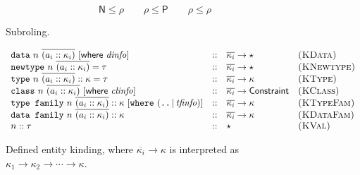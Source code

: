 \begin{figure}
\[
\textsf{N} \le \rho \qquad \rho \le \textsf{P} \qquad \rho \le \rho
\]
\caption{Subroling.}
\label{fig:subroling}
\end{figure}

\begin{figure}

\[
\begin{array}{lcll}
\texttt{data}~n~\overline{(a_i :: \kappa_i)} ~[\textsf{where}~ \mathit{dinfo}] &::& \overline{\kappa_i} \rightarrow \star & \textsc{(KData)}
\\
\texttt{newtype}~n~\overline{(a_i :: \kappa_i)} = \tau &::& \overline{\kappa_i} \rightarrow \star & \textsc{(KNewtype)}
\\
\texttt{type}~n~\overline{(a_i :: \kappa_i)} :: \kappa = \tau &::& \overline{\kappa_i} \rightarrow \kappa & \textsc{(KType)}
\\
\texttt{class}~n~\overline{(a_i :: \kappa_i)} ~[\textsf{where}~ \mathit{clinfo}] &::& \overline{\kappa_i} \rightarrow \textsf{Constraint} & \textsc{(KClass)}
\\
\texttt{type family}~n~\overline{(a_i :: \kappa_i)} :: \kappa ~[\texttt{where}~(\texttt{..} \,|\, \mathit{tfinfo})] &::& \overline{\kappa_i} \rightarrow \kappa & \textsc{(KTypeFam)}
\\
\texttt{data family}~n~\overline{(a_i :: \kappa_i)} :: \kappa &::& \overline{\kappa_i} \rightarrow \kappa & \textsc{(KDataFam)}
\\
n :: \tau &::& \star & \textsc{(KVal)}
\end{array}
\]
\caption{Defined entity kinding, where $\overline{\kappa_i} \rightarrow \kappa$ is interpreted as $\kappa_1 \rightarrow \kappa_2 \rightarrow \cdots \rightarrow \kappa$.}
\end{figure}

